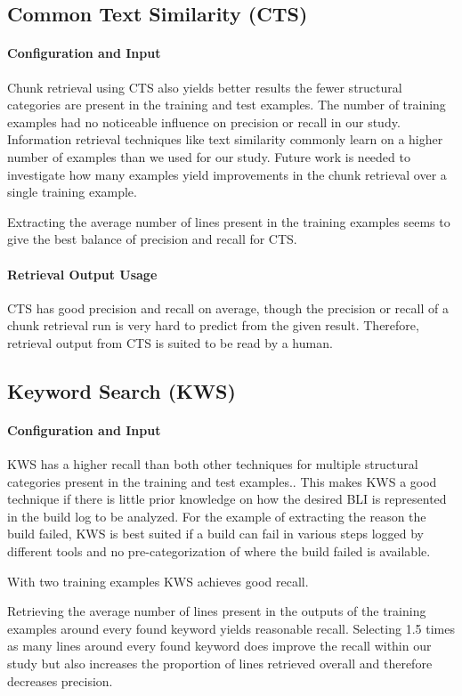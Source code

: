 \documentclass[\myrootdir/main.tex]{subfiles}
\begin{document}
\subsection{Common Text Similarity (CTS)}
\paragraph{Configuration and Input}
Chunk retrieval using CTS also yields better results the fewer structural categories are present in the training and test examples.
The number of training examples had no noticeable influence on precision or recall in our study.
Information retrieval techniques like text similarity commonly learn on a higher number of examples than we used for our study.
Future work is needed to investigate how many examples yield improvements in the chunk retrieval over a single training example.

Extracting the average number of lines present in the training examples seems to give the best balance of precision and recall for CTS\@.

\paragraph{Retrieval Output Usage}
CTS has good precision and recall on average, though the precision or recall of a chunk retrieval run is very hard to predict from the given result.
Therefore, retrieval output from CTS is suited to be read by a human.

\subsection{Keyword Search (KWS)}
\paragraph{Configuration and Input}
KWS has a higher recall than both other techniques for multiple structural categories present in the training and test examples.\@.
This makes KWS a good technique if there is little prior knowledge on how the desired BLI is represented in the build log to be analyzed.
For the example of extracting the reason the build failed, KWS is best suited if a build can fail in various steps logged by different tools and no pre-categorization of where the build failed is available.

With two training examples KWS achieves good recall.

Retrieving the average number of lines present in the outputs of the training examples around every found keyword yields reasonable recall.
Selecting 1.5 times as many lines around every found keyword does improve the recall within our study but also increases the proportion of lines retrieved overall and therefore decreases precision.
\end{document}
